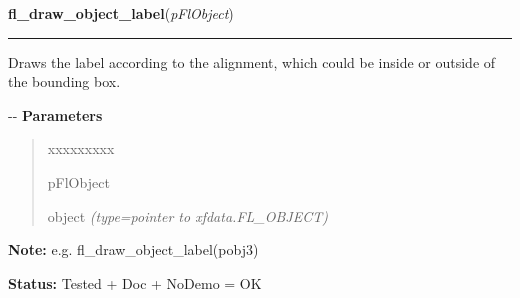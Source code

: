 \hspace{.8\funcindent}\begin{boxedminipage}{\funcwidth}

    \raggedright \textbf{fl\_draw\_object\_label}(\textit{pFlObject})

    \vspace{-1.5ex}

    \rule{\textwidth}{0.5\fboxrule}
\setlength{\parskip}{2ex}

Draws the label according to the alignment, which could be inside
or outside of the bounding box.

-{}-
\setlength{\parskip}{1ex}
      \textbf{Parameters}
      \vspace{-1ex}

      \begin{quote}
        \begin{Ventry}{xxxxxxxxx}

          \item[pFlObject]


object
            {\it (type=pointer to xfdata.FL\_OBJECT)}

        \end{Ventry}

      \end{quote}

\textbf{Note:} 
e.g. fl\_draw\_object\_label(pobj3)


\textbf{Status:} 
Tested + Doc + NoDemo = OK


    \end{boxedminipage}

    \label{xformslib:flbasic:fl_draw_object_label_outside}

    \vspace{0.5ex}

